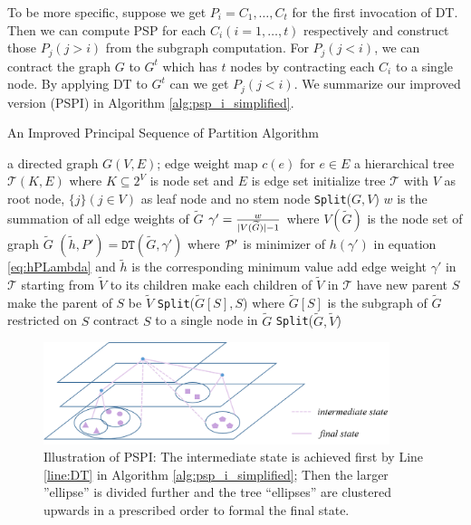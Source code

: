 To be more specific, suppose we get $P_i = {C_1, \dots, C_t}$ for the first invocation of DT. Then we can compute PSP for each $C_i(i=1,\dots, t)$ respectively and construct those $P_j(j>i)$ from the subgraph computation. For $P_j(j<i)$, we can contract the graph $G$  to $G^t$ which has $t$ nodes by contracting each $C_i$ to a single node. By applying DT to $G^t$ can we get $P_j(j<i)$. We summarize our improved version (PSPI) in Algorithm \ref{alg:psp_i_simplified}.

\begin{algorithm}
	\caption{An Improved Principal Sequence of Partition Algorithm}\label{alg:psp_i_simplified}
	\begin{algorithmic}[1]
		\REQUIRE a directed graph $G(V, E)$; edge weight map $c(e)$ for $e\in E$
		\ENSURE a hierarchical tree $\mathcal{T}(K, E)$ where $K \subseteq 2^{V}$ is node set and $E$ is edge set
		\STATE initialize tree $\mathcal{T}$ with $V$ as root node, $\{j\}(j \in V)$ as leaf node and no stem node
		\STATE \texttt{Split}($G, V$)
		\STATE $w$ is the summation of all edge weights of $\widetilde{G}$ 
		\STATE $\gamma' = \frac{w}{\abs{V(\widetilde{G})}-1}$ where $V(\widetilde{G})$ is the node set of graph $\widetilde{G}$ \label{alg:gamma_apostrophe}
		\STATE $(\tilde{h}, P') = \texttt{DT}(\widetilde{G}, \gamma')$ where $\P'$ is minimizer of $h(\gamma')$ in equation \eqref{eq:hPLambda} and $\tilde{h}$ is the corresponding minimum value  \label{line:DT}
		\STATE add edge weight $\gamma'$ in $\mathcal{T}$ starting from $\widetilde{V}$ to its children
		\ELSE
		\STATE make each children of $\widetilde{V}$ in $\mathcal{T}$ have new parent $S$		
		\STATE make the parent of $S$ be $\widetilde{V}$
		\STATE \texttt{Split}($\widetilde{G}[S], S$) where $\widetilde{G}[S]$ is the subgraph of $\widetilde{G}$ restricted on $S$
		\STATE contract $S$ to a single node in $\widetilde{G}$ %
		\ENDFOR 
		\STATE \texttt{Split}($\widetilde{G}, \widetilde{V}$)		
		\ENDIF
		\ENDFUNCTION
	\end{algorithmic}
\end{algorithm}

\begin{figure}
\centering
\includegraphics[width=0.9\textwidth]{improved_alg.png}
\caption{Illustration of PSPI: The intermediate state is achieved first by Line \ref{line:DT} in Algorithm \ref{alg:psp_i_simplified};
Then the larger ''ellipse'' is divided further and the tree ``ellipses'' are clustered upwards in a prescribed order to formal the final state.}\label{fig:pspi}
\end{figure}

